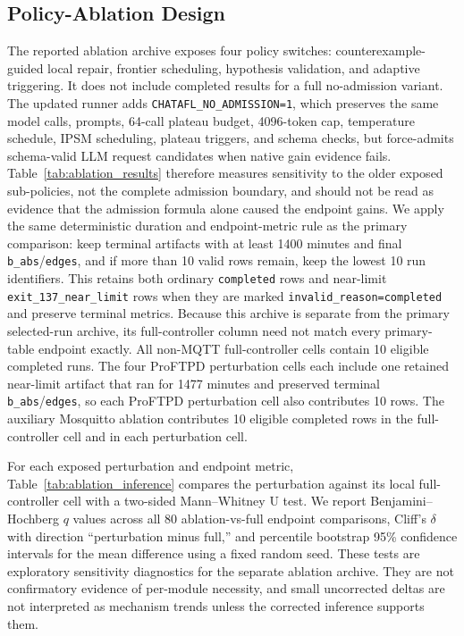 \documentclass[final,5p,times,number]{elsarticle}
\begin{document}
\subsection{Policy-Ablation Design}
The reported ablation archive exposes four policy switches: counterexample-guided local repair, frontier scheduling, hypothesis validation, and adaptive triggering. It does not include completed results for a full no-admission variant. The updated runner adds \texttt{CHATAFL\_NO\_ADMISSION=1}, which preserves the same model calls, prompts, 64-call plateau budget, 4096-token cap, temperature schedule, IPSM scheduling, plateau triggers, and schema checks, but force-admits schema-valid LLM request candidates when native gain evidence fails. Table~\ref{tab:ablation_results} therefore measures sensitivity to the older exposed sub-policies, not the complete admission boundary, and should not be read as evidence that the admission formula alone caused the endpoint gains. We apply the same deterministic duration and endpoint-metric rule as the primary comparison: keep terminal artifacts with at least 1400 minutes and final \texttt{b\_abs}/\texttt{edges}, and if more than 10 valid rows remain, keep the lowest 10 run identifiers. This retains both ordinary \texttt{completed} rows and near-limit \texttt{exit\_137\_near\_limit} rows when they are marked \texttt{invalid\_reason=completed} and preserve terminal metrics. Because this archive is separate from the primary selected-run archive, its full-controller column need not match every primary-table endpoint exactly. All non-MQTT full-controller cells contain 10 eligible completed runs. The four ProFTPD perturbation cells each include one retained near-limit artifact that ran for 1477 minutes and preserved terminal \texttt{b\_abs}/\texttt{edges}, so each ProFTPD perturbation cell also contributes 10 rows. The auxiliary Mosquitto ablation contributes 10 eligible completed rows in the full-controller cell and in each perturbation cell.

For each exposed perturbation and endpoint metric, Table~\ref{tab:ablation_inference} compares the perturbation against its local full-controller cell with a two-sided Mann--Whitney U test. We report Benjamini--Hochberg $q$ values across all 80 ablation-vs-full endpoint comparisons, Cliff's $\delta$ with direction ``perturbation minus full,'' and percentile bootstrap 95\% confidence intervals for the mean difference using a fixed random seed. These tests are exploratory sensitivity diagnostics for the separate ablation archive. They are not confirmatory evidence of per-module necessity, and small uncorrected deltas are not interpreted as mechanism trends unless the corrected inference supports them.
\end{document}
